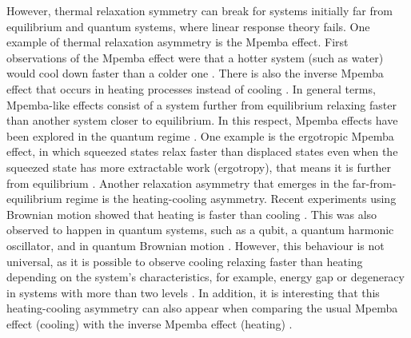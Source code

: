 However, thermal relaxation symmetry can break for systems initially far from equilibrium and quantum systems, where linear response theory fails. One example of thermal relaxation asymmetry is the Mpemba effect. First observations of the Mpemba effect were that a hotter system (such as water) would cool down faster than a colder one \cite{mpemba-1969, kell-1969, teza-2026}. There is also the inverse Mpemba effect that occurs in heating processes instead of cooling \cite{teza-2026}. In general terms, Mpemba-like effects consist of a system further from equilibrium relaxing faster than another system closer to equilibrium. In this respect, Mpemba effects have been explored in the quantum regime \cite{krissia-2024, summer-2026, calabrese-2026, ares-2025, teza-2026}. One example is the ergotropic Mpemba effect, in which squeezed states relax faster than displaced states even when the squeezed state has more extractable work (ergotropy), that means it is further from equilibrium \cite{medina-2025}. Another relaxation asymmetry that emerges in the far-from-equilibrium regime is the heating-cooling asymmetry. Recent experiments using Brownian motion showed that heating is faster than cooling \cite{lapolla-2020, ibanez-2024, dieball-2023}. This was also observed to happen in quantum systems, such as a qubit, a quantum harmonic oscillator, and in quantum Brownian motion \cite{tejero-2025, manikandan-2021}. However, this behaviour is not universal, as it is possible to observe cooling relaxing faster than heating depending on the system's characteristics, for example, energy gap or degeneracy in systems with more than two levels \cite{vu-2021, bravetti-2025, teza-2026}. In addition, it is interesting that this heating-cooling asymmetry can also appear when comparing the usual Mpemba effect (cooling) with the inverse Mpemba effect (heating) \cite{teza-2026}.

